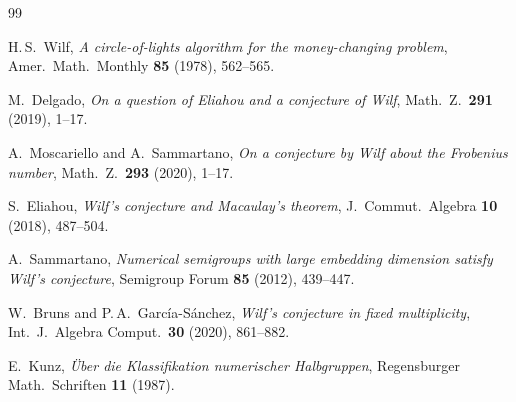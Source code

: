 \documentclass[11pt,a4paper]{amsart}
\theoremstyle{definition}
\theoremstyle{remark}
\begin{document}
\begin{thebibliography}{99}

H.\,S.~Wilf,
\emph{A circle-of-lights algorithm for the money-changing problem},
Amer.\ Math.\ Monthly \textbf{85} (1978), 562--565.

M.~Delgado,
\emph{On a question of Eliahou and a conjecture of Wilf},
Math.\ Z.\ \textbf{291} (2019), 1--17.

A.~Moscariello and A.~Sammartano,
\emph{On a conjecture by Wilf about the Frobenius number},
Math.\ Z.\ \textbf{293} (2020), 1--17.

S.~Eliahou,
\emph{Wilf's conjecture and Macaulay's theorem},
J.\ Commut.\ Algebra \textbf{10} (2018), 487--504.

A.~Sammartano,
\emph{Numerical semigroups with large embedding dimension satisfy
Wilf's conjecture},
Semigroup Forum \textbf{85} (2012), 439--447.

W.~Bruns and P.\,A.~Garc\'ia-S\'anchez,
\emph{Wilf's conjecture in fixed multiplicity},
Int.\ J.\ Algebra Comput.\ \textbf{30} (2020), 861--882.

E.~Kunz,
\emph{\"Uber die Klassifikation numerischer Halbgruppen},
Regensburger Math.\ Schriften \textbf{11} (1987).

\end{thebibliography}
\end{document}
